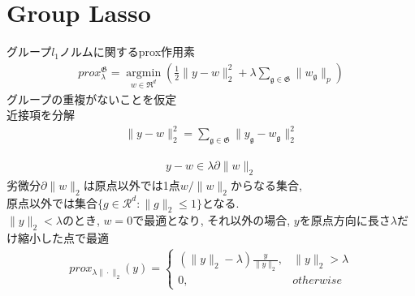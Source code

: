 \documentclass[dvipdfmx]{beamer}
\begin{document}
\section{Group Lasso}
\begin{frame}
    グループ$l_1$ノルムに関するprox作用素
    \begin{eqnarray}
        prox_{\lambda}^{\mathfrak{G}} = \underset{w \in \mathfrak{R}^d}{ \operatorname{argmin}} \left( \frac{1}{2} \| y - w \|_2^2 + \lambda \sum_{ \mathfrak{g} \in \mathfrak{G} } \| w_{ \mathfrak{g} } \|_p \right)
    \end{eqnarray}
    グループの重複がないことを仮定 \\
    近接項を分解
    \begin{eqnarray}
        \| y - w \|_2^2 = \sum_{\mathfrak{g} \in \mathfrak{G}} \| y_{\mathfrak{g}} - w_{\mathfrak{g}} \|_2^2
    \end{eqnarray}
\end{frame}
\begin{frame}
    \begin{eqnarray}
        y - w \in \lambda \partial \| w \|_2
    \end{eqnarray}
    劣微分$\partial \|w\|_2$は原点以外では1点$w/\|w\|_2$からなる集合, \\
    原点以外では集合$\{g \in \mathcal{R}^d : \|g\|_2 \le 1\}$となる. \\
    $\|y\|_2 < \lambda$のとき, $w=0$で最適となり, それ以外の場合, $y$を原点方向に長さ$\lambda$だけ縮小した点で最適\\
    \begin{eqnarray}
        prox_{\lambda\|\cdot\|_2}(y) = \begin{cases}
            (\|y\|_2 - \lambda)\frac{y}{\|y\|_2}, & \|y\|_2 > \lambda \\
            0, & otherwise
        \end{cases}
    \end{eqnarray}
\end{frame}
\end{document}
